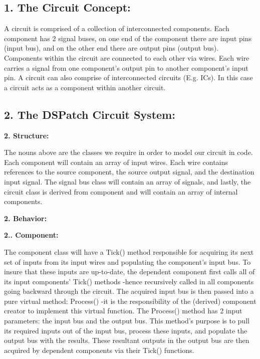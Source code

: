 \subsection*{1. The Circuit Concept\-:}

A circuit is comprised of a collection of interconnected components. Each component has 2 signal buses, on one end of the component there are input pins (input bus), and on the other end there are output pins (output bus). Components within the circuit are connected to each other via wires. Each wire carries a signal from one component's output pin to another component's input pin. A circuit can also comprise of interconnected circuits (E.\-g. I\-Cs). In this case a circuit acts as a component within another circuit.





\subsection*{2. The D\-S\-Patch Circuit System\-:}

{\bfseries 2. Structure\-:}

The nouns above are the classes we require in order to model our circuit in code. Each component will contain an array of input wires. Each wire contains references to the source component, the source output signal, and the destination input signal. The signal bus class will contain an array of signals, and lastly, the circuit class is derived from component and will contain an array of internal components.

{\bfseries 2. Behavior\-:}

{\bfseries 2.. Component\-:}

The component class will have a Tick() method responsible for acquiring its next set of inputs from its input wires and populating the component's input bus. To insure that these inputs are up-\/to-\/date, the dependent component first calls all of its input components' Tick() methods -\/hence recursively called in all components going backward through the circuit. The acquired input bus is then passed into a pure virtual method\-: Process() -\/it is the responsibility of the (derived) component creator to implement this virtual function. The Process() method has 2 input parameters\-: the input bus and the output bus. This method's purpose is to pull its required inputs out of the input bus, process these inputs, and populate the output bus with the results. These resultant outputs in the output bus are then acquired by dependent components via their Tick() functions.

